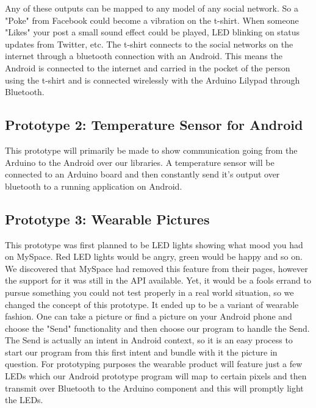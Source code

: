 Any of these outputs can be mapped to any model of any social network. So a "Poke" from Facebook could become a
vibration on the t-shirt. When someone "Likes" your post a small sound effect could be played, LED blinking on
status updates from Twitter, etc. The t-shirt connects to the social networks on the internet through a bluetooth
connection with an Android. This means the Android is connected to the internet and carried in the pocket of the
person using the t-shirt and is connected wirelessly with the Arduino Lilypad through Bluetooth.


\subsection{Prototype 2: Temperature Sensor for Android}
This prototype will primarily be made to show communication going from the Arduino to the Android over our libraries. 
A temperature sensor will be connected to an Arduino board and then constantly send it's output over bluetooth to a 
running application on Android. 

\subsection{Prototype 3: Wearable Pictures}
This prototype was first planned to be LED lights showing what mood you had on MySpace. Red LED lights would be angry,
 green would be happy and so on. We discovered that MySpace had removed this feature from their pages, however the 
support for it was still in the API available. Yet, it would be a fools errand to pursue something you could not test properly 
in a real world situation, so we changed the concept of this prototype. It ended up to be a variant of wearable fashion. 
One can take a picture or find a picture on your Android phone and choose the "Send" functionality and then choose our 
program to handle the Send. The Send is actually an intent in Android context, so it is an easy process to start our program 
from this first intent and bundle with it the picture in question. For prototyping purposes the wearable product will feature just 
a few LEDs which our Android prototype program will map to certain pixels and then transmit over Bluetooth to the Arduino 
component and this will promptly light the LEDs.
